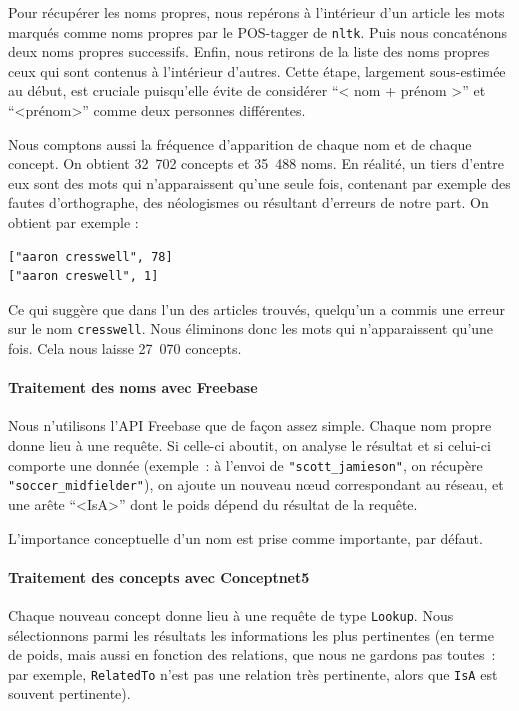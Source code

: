 \documentclass[a4paper, 12pt]{article}
\newcommand{\pyt}[1]{\texttt{#1}}%
\begin{document}
Pour récupérer les noms propres, nous repérons à l'intérieur d'un article les mots marqués comme noms propres par le POS-tagger de \pyt{nltk}. Puis nous concaténons deux noms propres successifs. Enfin, nous retirons de la liste des noms propres ceux qui sont contenus à l'intérieur d'autres. Cette étape, largement sous-estimée au début, est cruciale puisqu'elle évite de considérer ``< nom + prénom >'' et ``<prénom>'' comme deux personnes différentes.

Nous comptons aussi la fréquence d'apparition de chaque nom et de chaque concept. 
On obtient 32~702 concepts et 35~488 noms. En réalité, un tiers d'entre eux sont des mots qui n'apparaissent qu'une seule fois, contenant par exemple des fautes d'orthographe, des néologismes ou résultant d'erreurs de notre part. On obtient par exemple :
\begin{verbatim}
["aaron cresswell", 78]
["aaron creswell", 1]
\end{verbatim}
Ce qui suggère que dans l'un des articles trouvés, quelqu'un a commis une erreur sur le nom \verb|cresswell|. Nous éliminons donc les mots qui n'apparaissent qu'une fois. Cela nous laisse 27~070 concepts.

\paragraph{Traitement des noms avec Freebase}

Nous n'utilisons l'API Freebase que de fa\c{c}on assez simple. Chaque nom propre donne lieu à une requête. Si celle-ci aboutit, on analyse le résultat et si celui-ci comporte une donnée (exemple~: à l'envoi de \verb|"scott_jamieson"|, on récupère \verb|"soccer_midfielder"|), on ajoute un nouveau nœud correspondant au réseau, et une arête ``<IsA>'' dont le poids dépend du résultat de la requête.

L'importance conceptuelle d'un nom est prise comme importante, par défaut.

\paragraph{Traitement des concepts avec Conceptnet5}

Chaque nouveau concept donne lieu à une requête de type \verb|Lookup|. Nous sélectionnons parmi les résultats les informations les plus pertinentes (en terme de poids, mais aussi en fonction des relations, que nous ne gardons pas toutes~: par exemple, \verb|RelatedTo| n'est pas une relation très pertinente, alors que \verb|IsA| est souvent pertinente).
\end{document}
